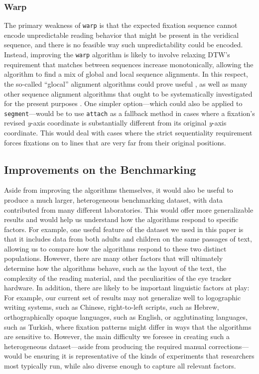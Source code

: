 \documentclass[doc,biblatex]{apa7}
\begin{document}
\subsubsection{Warp}

The primary weakness of \texttt{warp} is that the expected fixation sequence cannot encode unpredictable reading behavior that might be present in the veridical sequence, and there is no feasible way such unpredictability could be encoded. Instead, improving the \texttt{warp} algorithm is likely to involve relaxing DTW's requirement that matches between sequences increase monotonically, allowing the algorithm to find a mix of global and local sequence alignments. In this respect, the so-called ``glocal'' alignment algorithms could prove useful \parencite{Brudno:2003}, as well as many other sequence alignment algorithms that ought to be systematically investigated for the present purposes \parencite[e.g.,][]{Keogh:2001,Uchida:2005,Tomasi:2004,Tormene:2009}. One simpler option---which could also be applied to \texttt{segment}---would be to use \texttt{attach} as a fallback method in cases where a fixation's revised \textit{y}-axis coordinate is substantially different from its original \textit{y}-axis coordinate. This would deal with cases where the strict sequentiality requirement forces fixations on to lines that are very far from their original positions.

\subsection{Improvements on the Benchmarking}

Aside from improving the algorithms themselves, it would also be useful to produce a much larger, heterogeneous benchmarking dataset, with data contributed from many different laboratories. This would offer more generalizable results and would help us understand how the algorithms respond to specific factors. For example, one useful feature of the dataset we used in this paper is that it includes data from both adults and children on the same passages of text, allowing us to compare how the algorithms respond to these two distinct populations. However, there are many other factors that will ultimately determine how the algorithms behave, such as the layout of the text, the complexity of the reading material, and the peculiarities of the eye tracker hardware. In addition, there are likely to be important linguistic factors at play: For example, our current set of results may not generalize well to logographic writing systems, such as Chinese, right-to-left scripts, such as Hebrew, orthographically opaque languages, such as English, or agglutinating languages, such as Turkish, where fixation patterns might differ in ways that the algorithms are sensitive to. However, the main difficulty we foresee in creating such a heterogeneous dataset---aside from producing the required manual corrections---would be ensuring it is representative of the kinds of experiments that researchers most typically run, while also diverse enough to capture all relevant factors.
\end{document}
